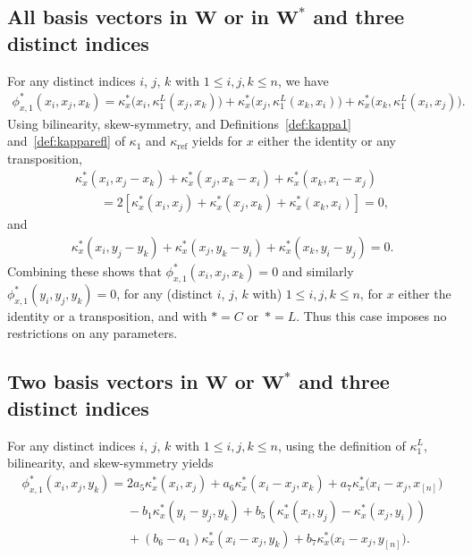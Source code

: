 \documentclass[10pt,a4paper]{amsart}
\numberwithin{equation}{section}
\DeclareMathOperator{\refl}{ref}
\begin{document}
\subsection[All basis vectors in W or in W* and three distinct indices]
{All basis vectors in $\boldsymbol W$ or in $\boldsymbol{W^*}$ and three distinct indices}\label{AllVecInW}

For any distinct indices $i$, $j$, $k$ with $1 \leq i, j, k \leq n$, we have
\begin{gather*}
\phi_{x,1}^*(x_i,x_j,x_k)=\kappa^*_x\big(x_i,\kappa^L_1(x_j,x_k)\big)+\kappa^*_x\big(x_j,\kappa^L_1(x_k,x_i)\big) +\kappa^*_x\big(x_k,\kappa^L_1(x_i,x_j)\big).
\end{gather*}
Using bilinearity, skew-symmetry, and Definitions~\ref{def:kappa1}
and~\ref{def:kapparefl} of $\kappa_1$ and
$\kappa_{\refl}$ yields for $x$ either the identity or
any transposition,
\begin{gather*}
\kappa^*_x(x_i,x_j-x_k)+\kappa^*_x(x_j,x_k-x_i)+\kappa^*_x(x_k,x_i-x_j)
\\ \qquad
{}=2[\kappa^*_x(x_i,x_j)+\kappa^*_x(x_j,x_k)+\kappa^*_x(x_k,x_i)]=0,	
\end{gather*}
and
\begin{gather*}
\kappa^*_x(x_i,y_j-y_k)+\kappa^*_x(x_j,y_k-y_i)+\kappa^*_x(x_k,y_i-y_j)=0.
\end{gather*}
Combining these shows that $\phi_{x,1}^*(x_i,x_j,x_k)=0$
and similarly $\phi_{x,1}^*(y_i,y_j,y_k)=0$, for any (distinct $i$, $j$, $k$ with) $1 \leq i, j, k \leq n$,
for $x$ either the identity or a transposition, and with $*=C$ or~$*=L$.
Thus this case imposes no restrictions on any parameters.

\subsection[Two basis vectors in W or W* and three distinct indices]
{Two basis vectors in $\boldsymbol W$ or $\boldsymbol{W^*}$ and three distinct indices}%

For any distinct indices $i$, $j$, $k$ with $1 \leq i, j, k \leq n$,
using the definition of $\kappa^L_1$, bilinearity, and skew-symmetry yields
\begin{gather*}
\phi_{x,1}^*(x_i,x_j,y_k)
=2a_5 \kappa^*_x(x_i,x_j) + a_6 \kappa^*_x(x_i-x_j,x_k) + a_7 \kappa^*_x\big(x_i-x_j,x_{[n]}\big)
\\ \phantom{\phi_{x,1}^*(x_i,x_j,y_k)=}
{}-b_1 \kappa^*_x(y_i-y_j,y_k)+b_5\left(\kappa^*_x(x_i,y_j) - \kappa^*_x(x_j,y_i)\right)
\\ \phantom{\phi_{x,1}^*(x_i,x_j,y_k)=}
{}+(b_6 - a_1)\kappa^*_x(x_i-x_j,y_k) + b_7 \kappa^*_x\big(x_i-x_j,y_{[n]}\big).
\end{gather*}
\end{document}
